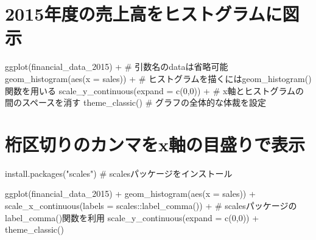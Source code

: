 \documentclass[
  letterpaper,
  DIV=11,
  numbers=noendperiod]{scrreprt}
\newenvironment{Shaded}{\begin{snugshade}}{\end{snugshade}}
\newcommand{\AttributeTok}[1]{\textcolor[rgb]{0.40,0.45,0.13}{#1}}
\newcommand{\CommentTok}[1]{\textcolor[rgb]{0.37,0.37,0.37}{#1}}
\newcommand{\DecValTok}[1]{\textcolor[rgb]{0.68,0.00,0.00}{#1}}
\newcommand{\FunctionTok}[1]{\textcolor[rgb]{0.28,0.35,0.67}{#1}}
\newcommand{\NormalTok}[1]{\textcolor[rgb]{0.00,0.23,0.31}{#1}}
\newcommand{\SpecialCharTok}[1]{\textcolor[rgb]{0.37,0.37,0.37}{#1}}
\newcommand{\StringTok}[1]{\textcolor[rgb]{0.13,0.47,0.30}{#1}}
\begin{document}
\section{2015年度の売上高をヒストグラムに図示}\label{ux5e74ux5ea6ux306eux58f2ux4e0aux9ad8ux3092ux30d2ux30b9ux30c8ux30b0ux30e9ux30e0ux306bux56f3ux793a}

\begin{Shaded}
\begin{Highlighting}[]
\FunctionTok{ggplot}\NormalTok{(financial\_data\_2015) }\SpecialCharTok{+} \CommentTok{\# 引数名のdataは省略可能}
  \FunctionTok{geom\_histogram}\NormalTok{(}\FunctionTok{aes}\NormalTok{(}\AttributeTok{x =}\NormalTok{ sales)) }\SpecialCharTok{+} \CommentTok{\# ヒストグラムを描くにはgeom\_histogram()関数を用いる}
  \FunctionTok{scale\_y\_continuous}\NormalTok{(}\AttributeTok{expand =} \FunctionTok{c}\NormalTok{(}\DecValTok{0}\NormalTok{,}\DecValTok{0}\NormalTok{)) }\SpecialCharTok{+} \CommentTok{\# x軸とヒストグラムの間のスペースを消す}
  \FunctionTok{theme\_classic}\NormalTok{() }\CommentTok{\# グラフの全体的な体裁を設定}
\end{Highlighting}
\end{Shaded}

\section{桁区切りのカンマをx軸の目盛りで表示}\label{ux6841ux533aux5207ux308aux306eux30abux30f3ux30deux3092xux8ef8ux306eux76eeux76dbux308aux3067ux8868ux793a}

\begin{Shaded}
\begin{Highlighting}[]
\FunctionTok{install.packages}\NormalTok{(}\StringTok{"scales"}\NormalTok{) }\CommentTok{\# scalesパッケージをインストール}

\FunctionTok{ggplot}\NormalTok{(financial\_data\_2015) }\SpecialCharTok{+}
  \FunctionTok{geom\_histogram}\NormalTok{(}\FunctionTok{aes}\NormalTok{(}\AttributeTok{x =}\NormalTok{ sales)) }\SpecialCharTok{+}
  \FunctionTok{scale\_x\_continuous}\NormalTok{(}\AttributeTok{labels =}\NormalTok{ scales}\SpecialCharTok{::}\FunctionTok{label\_comma}\NormalTok{()) }\SpecialCharTok{+} \CommentTok{\# scalesパッケージのlabel\_comma()関数を利用}
  \FunctionTok{scale\_y\_continuous}\NormalTok{(}\AttributeTok{expand =} \FunctionTok{c}\NormalTok{(}\DecValTok{0}\NormalTok{,}\DecValTok{0}\NormalTok{)) }\SpecialCharTok{+} 
  \FunctionTok{theme\_classic}\NormalTok{()}
\end{Highlighting}
\end{Shaded}
\end{document}
